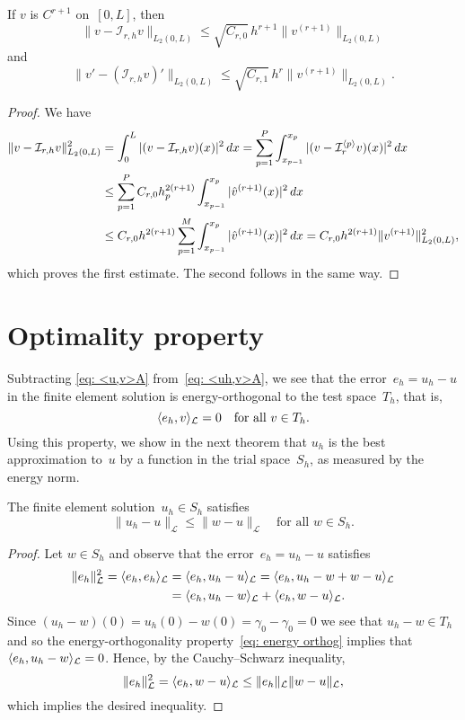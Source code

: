 \begin{theorem}\label{thm: Q r h}
If $v$ is $C^{r+1}$ on~$[0,L]$, then
\[
\|v-\mathcal{I}_{r,h}v\|_{L_2(0,L)}
    \le\sqrt{C_{r,0}}\,h^{r+1}\|v^{(r+1)}\|_{L_2(0,L)}
\]
and
\[
\|v'-(\mathcal{I}_{r,h}v)'\|_{L_2(0,L)}
    \le\sqrt{C_{r,1}}\,h^r\|v^{(r+1)}\|_{L_2(0,L)}.
\]
\end{theorem}
\begin{proof}
We have
\begin{align*}
\|v-\mathcal{I}_{r,h}v\|_{L_2(0,L)}^2
    &=\int_0^L|(v-\mathcal{I}_{r,h}v)(x)|^2\,dx=\sum_{p=1}^P
    \int_{x_{p-1}}^{x_p}|(v-\mathcal{I}_r^{\langle p\rangle}v)(x)|^2\,dx\\
    &\le\sum_{p=1}^P C_{r,0}h_p^{2(r+1)}\int_{x_{p-1}}^{x_p}
        |\hat v^{(r+1)}(x)|^2\,dx\\
    &\le C_{r,0}h^{2(r+1)}\sum_{p=1}^M\int_{x_{p-1}}^{x_p} 
        |\hat v^{(r+1)}(x)|^2\,dx
    =C_{r,0}h^{2(r+1)}\|v^{(r+1)}\|_{L_2(0,L)}^2,
\end{align*}
which proves the first estimate.  The second follows in the same way.
\end{proof}

\section{Optimality property}
Subtracting \eqref{eq: <u,v>A} from~\eqref{eq: <uh,v>A}, we see that the
error~$e_h=u_h-u$ in the finite element solution is energy-orthogonal to the 
test space~$T_h$, that is, 
\begin{equation}\label{eq: energy orthog}
\langle e_h,v\rangle_{\mathcal{L}}=0\quad\text{for all $v\in T_h$.}
\end{equation}
Using this property, we show in the next theorem that $u_h$ is the best 
approximation to~$u$ by a function in the trial space~$S_h$, as measured by 
the energy norm.

\begin{theorem}\label{thm: optimality}
The finite element solution~$u_h\in S_h$ satisfies
\[
\|u_h-u\|_{\mathcal{L}}\le\|w-u\|_{\mathcal{L}}
	\quad\text{for all $w\in S_h$.}
\]
\end{theorem}
\begin{proof}
Let $w\in S_h$ and observe that the error~$e_h=u_h-u$ satisfies
\begin{align*}
\|e_h\|_{\mathcal{L}}^2=\langle e_h,e_h\rangle_{\mathcal{L}}
	&=\langle e_h,u_h-u\rangle_{\mathcal{L}}
	=\langle e_h,u_h-w+w-u\rangle_{\mathcal{L}}\\
	&=\langle e_h,u_h-w\rangle_{\mathcal{L}}+\langle e_h,w-u\rangle_{\mathcal{L}}.
\end{align*}
Since $(u_h-w)(0)=u_h(0)-w(0)=\gamma_0-\gamma_0=0$ we see that $u_h-w\in T_h$
and so the energy-orthogonality property~\eqref{eq: energy orthog} implies
that $\langle e_h,u_h-w\rangle_{\mathcal{L}}=0$.  Hence, by the Cauchy--Schwarz
inequality,
\[
\|e_h\|_{\mathcal{L}}^2=\langle e_h,w-u\rangle_{\mathcal{L}}
	\le\|e_h\|_{\mathcal{L}}\|w-u\|_{\mathcal{L}},
\]
which implies the desired inequality.
\end{proof}

